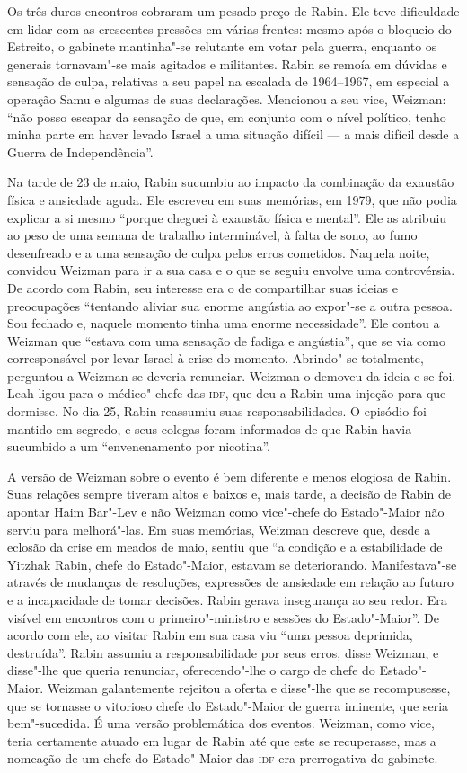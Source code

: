 Os três duros encontros cobraram um pesado preço de Rabin. Ele teve
dificuldade em lidar com as crescentes pressões em várias frentes: mesmo
após o bloqueio do Estreito, o gabinete mantinha"-se relutante em votar
pela guerra, enquanto os generais tornavam"-se mais agitados e
militantes. Rabin se remoía em dúvidas e sensação de culpa,
relativas a seu papel na escalada de 1964--1967, em especial a operação
Samu e algumas de suas declarações. Mencionou a seu vice,
Weizman: ``não posso escapar da sensação de que, em conjunto com o nível
político, tenho minha parte em haver levado Israel a uma situação
difícil --- a mais difícil desde a Guerra de Independência''.

Na tarde de 23 de maio, Rabin sucumbiu ao impacto da combinação da
exaustão física e ansiedade aguda. Ele escreveu em suas memórias, em 1979,
que não podia explicar a si mesmo ``porque cheguei à exaustão física e
mental''. Ele as atribuiu ao peso de uma semana de trabalho
interminável, à falta de sono, ao fumo desenfreado e a uma sensação de
culpa pelos erros cometidos. Naquela noite, convidou Weizman para ir a
sua casa e o que se seguiu envolve uma controvérsia. De acordo
com Rabin, seu interesse era o de compartilhar suas ideias e
preocupações ``tentando aliviar sua enorme angústia ao expor"-se a outra
pessoa. Sou fechado e, naquele momento tinha uma enorme necessidade''.
Ele contou a Weizman que ``estava com uma sensação de fadiga e
angústia'', que se via como corresponsável por levar Israel à crise do
momento. Abrindo"-se totalmente, perguntou a Weizman se deveria renunciar.
Weizman o demoveu da ideia e se foi. Leah ligou para o médico"-chefe das
\textsc{idf}, que deu a Rabin uma injeção para que dormisse. No dia 25, Rabin
reassumiu suas responsabilidades. O episódio foi mantido em segredo, e
seus colegas foram informados de que Rabin havia sucumbido a um
``envenenamento por nicotina''.

A versão de Weizman sobre o evento é bem diferente e menos elogiosa de
Rabin. Suas relações sempre tiveram altos e baixos e, mais tarde, a
decisão de Rabin de apontar Haim Bar"-Lev e não Weizman como vice"-chefe
do Estado"-Maior não serviu para melhorá"-las. Em suas memórias, Weizman
descreve que, desde a eclosão da crise em meados de maio, sentiu que
``a condição e a estabilidade de Yitzhak Rabin, chefe do Estado"-Maior,
estavam se deteriorando. Manifestava"-se através de mudanças de resoluções,
expressões de ansiedade em relação ao futuro e a incapacidade de tomar
decisões. Rabin gerava insegurança ao seu redor. Era visível em
encontros com o primeiro"-ministro e sessões do Estado"-Maior''. De acordo
com ele, ao visitar Rabin em sua casa viu ``uma pessoa
deprimida, destruída''. Rabin assumiu a responsabilidade por seus erros,
disse Weizman, e disse"-lhe que queria renunciar, oferecendo"-lhe o cargo
de chefe do Estado"-Maior. Weizman galantemente rejeitou a oferta e
disse"-lhe que se recompusesse, que se tornasse o vitorioso chefe do
Estado"-Maior de guerra iminente, que seria bem"-sucedida. É uma versão
problemática dos eventos. Weizman, como vice, teria certamente atuado em
lugar de Rabin até que este se recuperasse, mas a nomeação de um chefe
do Estado"-Maior das \textsc{idf} era prerrogativa do gabinete.

